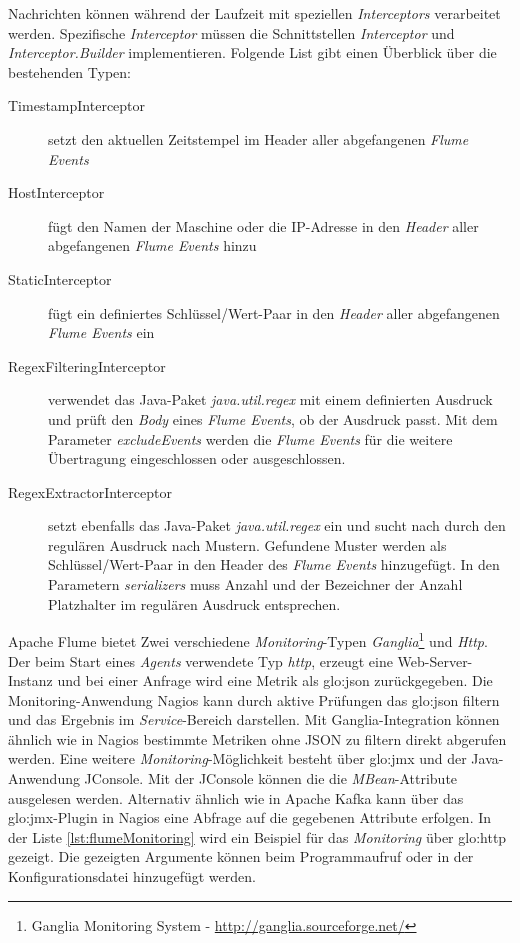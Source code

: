 Nachrichten können während der Laufzeit mit speziellen \textit{Interceptors} verarbeitet werden. Spezifische \textit{Interceptor} müssen die Schnittstellen \textit{Interceptor} und \textit{Interceptor.Builder} implementieren. Folgende List gibt einen Überblick über die bestehenden Typen:
\begin{description}
	\item[TimestampInterceptor] setzt den aktuellen Zeitstempel im Header aller abgefangenen \textit{Flume Events} 
	\item[HostInterceptor] fügt den Namen der Maschine oder die IP-Adresse in den \textit{Header} aller abgefangenen \textit{Flume Events} hinzu 
	\item[StaticInterceptor] fügt ein definiertes Schlüssel/Wert-Paar in den \textit{Header} aller abgefangenen \textit{Flume Events} ein 
	\item[RegexFilteringInterceptor] verwendet das Java-Paket \textit{java.util.regex} mit einem definierten Ausdruck und prüft den \textit{Body} eines \textit{Flume Events}, ob der Ausdruck passt. Mit dem Parameter \textit{excludeEvents} werden die \textit{Flume Events} für die weitere Übertragung eingeschlossen oder ausgeschlossen. 
	\item[RegexExtractorInterceptor] setzt ebenfalls das Java-Paket \textit{java.util.regex} ein und sucht nach durch den regulären Ausdruck nach Mustern. Gefundene Muster werden als Schlüssel/Wert-Paar in den Header des \textit{Flume Events} hinzugefügt. In den Parametern \textit{serializers} muss Anzahl und der Bezeichner der Anzahl Platzhalter im regulären Ausdruck entsprechen. 
\end{description}

Apache Flume bietet Zwei verschiedene \textit{Monitoring}-Typen \textit{Ganglia}\footnote{Ganglia Monitoring System - \url{http://ganglia.sourceforge.net/}} und \textit{Http}. Der beim Start eines \textit{Agents} verwendete Typ \textit{http}, erzeugt eine Web-Server-Instanz und bei einer Anfrage wird eine Metrik als \gls{glo:json} zurückgegeben. Die Monitoring-Anwendung Nagios kann durch aktive Prüfungen das \gls{glo:json} filtern und das Ergebnis im \textit{Service}-Bereich darstellen. Mit Ganglia-Integration können ähnlich wie in Nagios bestimmte Metriken ohne JSON zu filtern direkt abgerufen werden. Eine weitere \textit{Monitoring}-Möglichkeit besteht über \gls{glo:jmx} und der Java-Anwendung JConsole. Mit der JConsole können die die \textit{MBean}-Attribute ausgelesen werden. Alternativ ähnlich wie in Apache Kafka kann über das \gls{glo:jmx}-Plugin in Nagios eine Abfrage auf die gegebenen Attribute erfolgen. In der Liste \ref{lst:flumeMonitoring} wird ein Beispiel für das \textit{Monitoring} über \gls{glo:http} gezeigt. Die gezeigten Argumente können beim Programmaufruf oder in der Konfigurationsdatei hinzugefügt werden. 


